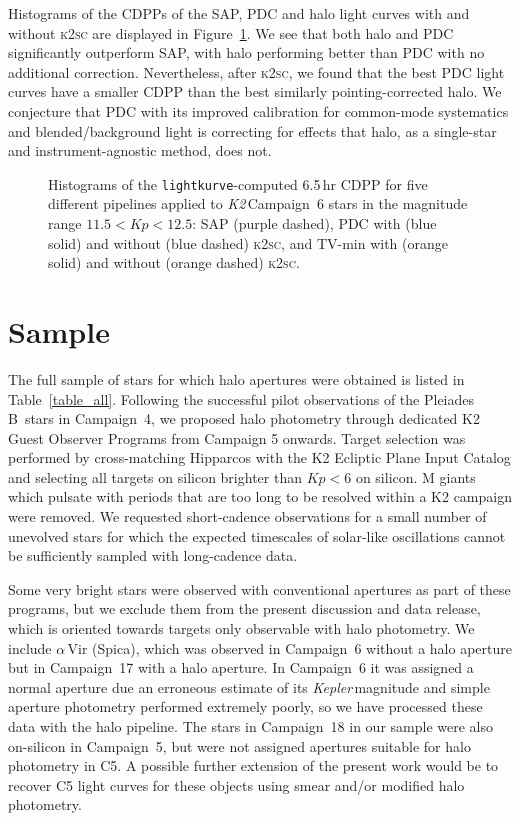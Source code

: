 \documentclass[modern]{aastex62}
\newcommand\kepler{\emph{Kepler}\,}
\newcommand\ktwo{\emph{K2}\,}
\begin{document}
Histograms of the CDPPs of the SAP, PDC and halo light curves with and without \textsc{k2sc} are displayed in Figure~\ref{fig:cdpphists}. We see that both halo and PDC significantly outperform SAP, with halo performing better than PDC with no additional correction. Nevertheless, after \textsc{k2sc}, we found that the best PDC light curves have a smaller CDPP than the best similarly pointing-corrected halo. We conjecture that PDC with its improved calibration for common-mode systematics and blended/background light is correcting for effects that halo, as a single-star and instrument-agnostic method, does not.

\begin{figure}
\caption{Histograms of the \texttt{lightkurve}-computed 6.5\,hr CDPP for five different pipelines applied to \ktwo Campaign~6 stars in the magnitude range $11.5 < Kp < 12.5$: SAP (purple dashed), PDC with (blue solid) and without (blue dashed) \textsc{k2sc}, and TV-min with (orange solid) and without (orange dashed) \textsc{k2sc}.}
\label{fig:cdpphists}
\end{figure}


\section{Sample}
\label{sec:sample}


The full sample of stars for which halo apertures were obtained is listed in Table~\ref{table_all}. Following the successful pilot observations of the Pleiades B~stars in Campaign~4, we proposed halo photometry through dedicated K2 Guest Observer Programs from Campaign 5 onwards. Target selection was performed by cross-matching Hipparcos \citep{leeuwen07} with the K2 Ecliptic Plane Input Catalog \citep[EPIC,][]{huber16} and selecting all targets on silicon brighter than $Kp < 6$ on silicon. M giants which pulsate with periods that are too long to be resolved within a K2 campaign were removed. We requested short-cadence observations for a small number of unevolved stars for which the expected timescales of solar-like oscillations cannot be sufficiently sampled with long-cadence data.


 Some very bright stars were observed with conventional apertures as part of these programs, but we exclude them from the present discussion and data release, which is oriented towards targets only observable with halo photometry. 
We include $\alpha$\,Vir (Spica), which was observed in Campaign~6 without a halo aperture but in Campaign~17 with a halo aperture. In Campaign~6 it was assigned a normal aperture due an erroneous estimate of its \kepler magnitude and simple aperture photometry performed extremely poorly, so we have processed these data with the halo pipeline. The stars in Campaign~18 in our sample were also on-silicon in Campaign~5, but were not assigned apertures suitable for halo photometry in C5. A possible further extension of the present work would be to recover C5 light curves for these objects using smear and/or modified halo photometry.
\end{document}

